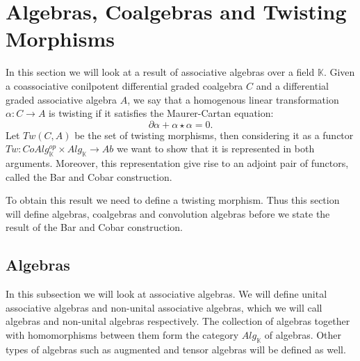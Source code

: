 \documentclass[../thesis.tex]{subfiles}
\begin{document}
    \section{Algebras, Coalgebras and Twisting Morphisms}

        In this section we will look at a result of associative algebras over a field $\mathbb{K}$. Given a coassociative conilpotent differential graded coalgebra $C$ and a differential graded associative algebra $A$, we say that a homogenous linear transformation $\alpha: C\rightarrow A$ is twisting if it satisfies the Maurer-Cartan equation:
            \begin{equation*}
                \partial\alpha + \alpha\star\alpha = 0.
            \end{equation*}
        Let $Tw(C,A)$ be the set of twisting morphisms, then considering it as a functor $Tw : CoAlg_{\mathbb{K}}^{op}\times Alg_{\mathbb{K}} \rightarrow Ab$ we want to show that it is represented in both arguments. Moreover, this representation give rise to an adjoint pair of functors, called the Bar and Cobar construction.

            \begin{center}
            \end{center}

        To obtain this result we need to define a twisting morphism. Thus this section will define algebras, coalgebras and convolution algebras before we state the result of the Bar and Cobar construction.

        \subsection{Algebras}

            In this subsection we will look at associative algebras. We will define unital associative algebras and non-unital associative algebras, which we will call algebras and non-unital algebras respectively. The collection of algebras together with homomorphisms between them form the category $Alg_{\mathbb{K}}$ of algebras. Other types of algebras such as augmented and tensor algebras will be defined as well.
\end{document}
